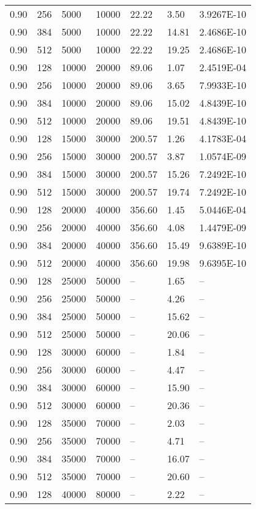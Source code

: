 \begin{tabular}{l|l|l|l|l|l|l}
0.90 & 256 &   5000 &  10000 & 22.22 &  3.50 & 3.9267E-10\\
0.90 & 384 &   5000 &  10000 & 22.22 & 14.81 & 2.4686E-10\\
0.90 & 512 &   5000 &  10000 & 22.22 & 19.25 & 2.4686E-10\\
0.90 & 128 &  10000 &  20000 & 89.06 &  1.07 & 2.4519E-04\\
0.90 & 256 &  10000 &  20000 & 89.06 &  3.65 & 7.9933E-10\\
0.90 & 384 &  10000 &  20000 & 89.06 & 15.02 & 4.8439E-10\\
0.90 & 512 &  10000 &  20000 & 89.06 & 19.51 & 4.8439E-10\\
0.90 & 128 &  15000 &  30000 & 200.57 &  1.26 & 4.1783E-04\\
0.90 & 256 &  15000 &  30000 & 200.57 &  3.87 & 1.0574E-09\\
0.90 & 384 &  15000 &  30000 & 200.57 & 15.26 & 7.2492E-10\\
0.90 & 512 &  15000 &  30000 & 200.57 & 19.74 & 7.2492E-10\\
0.90 & 128 &  20000 &  40000 & 356.60 &  1.45 & 5.0446E-04\\
0.90 & 256 &  20000 &  40000 & 356.60 &  4.08 & 1.4479E-09\\
0.90 & 384 &  20000 &  40000 & 356.60 & 15.49 & 9.6389E-10\\
0.90 & 512 &  20000 &  40000 & 356.60 & 19.98 & 9.6395E-10\\
0.90 & 128 &  25000 &  50000 & -- &  1.65 & --\\
0.90 & 256 &  25000 &  50000 & -- &  4.26 & --\\
0.90 & 384 &  25000 &  50000 & -- & 15.62 & --\\
0.90 & 512 &  25000 &  50000 & -- & 20.06 & --\\
0.90 & 128 &  30000 &  60000 & -- &  1.84 & --\\
0.90 & 256 &  30000 &  60000 & -- &  4.47 & --\\
0.90 & 384 &  30000 &  60000 & -- & 15.90 & --\\
0.90 & 512 &  30000 &  60000 & -- & 20.36 & --\\
0.90 & 128 &  35000 &  70000 & -- &  2.03 & --\\
0.90 & 256 &  35000 &  70000 & -- &  4.71 & --\\
0.90 & 384 &  35000 &  70000 & -- & 16.07 & --\\
0.90 & 512 &  35000 &  70000 & -- & 20.60 & --\\
0.90 & 128 &  40000 &  80000 & -- &  2.22 & --\\

\end{tabular}
